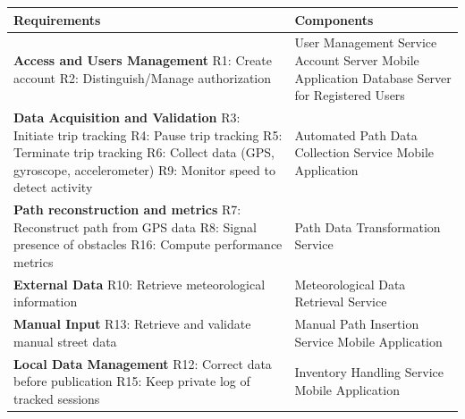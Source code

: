 \begin{table}[H]
\centering
\renewcommand{\arraystretch}{1.5} 
\begin{tabular}{|p{}|p{}|}
\hline
\textbf{Requirements} & \textbf{Components} \\
\hline

\textbf{Access and Users Management} \newline
R1: Create account \newline
R2: Distinguish/Manage authorization & 
User Management Service \newline
Account Server \newline
Mobile Application \newline
Database Server for Registered Users \\
\hline

\textbf{Data Acquisition and Validation} \newline
R3: Initiate trip tracking \newline
R4: Pause trip tracking \newline
R5: Terminate trip tracking \newline
R6: Collect data (GPS, gyroscope, accelerometer) \newline
R9: Monitor speed to detect activity & 
Automated Path Data Collection Service \newline
Mobile Application \\
\hline

\textbf{Path reconstruction and metrics} \newline
R7: Reconstruct path from GPS data \newline
R8: Signal presence of obstacles \newline
R16: Compute performance metrics & 
Path Data Transformation Service \\
\hline

\textbf{External Data} \newline
R10: Retrieve meteorological information & 
Meteorological Data Retrieval Service \\
\hline

\textbf{Manual Input} \newline
R13: Retrieve and validate manual street data & 
Manual Path Insertion Service \newline
Mobile Application \\
\hline

\textbf{Local Data Management} \newline
R12: Correct data before publication \newline
R15: Keep private log of tracked sessions & 
Inventory Handling Service \newline
Mobile Application \\
\hline


\end{tabular}
\end{table}
